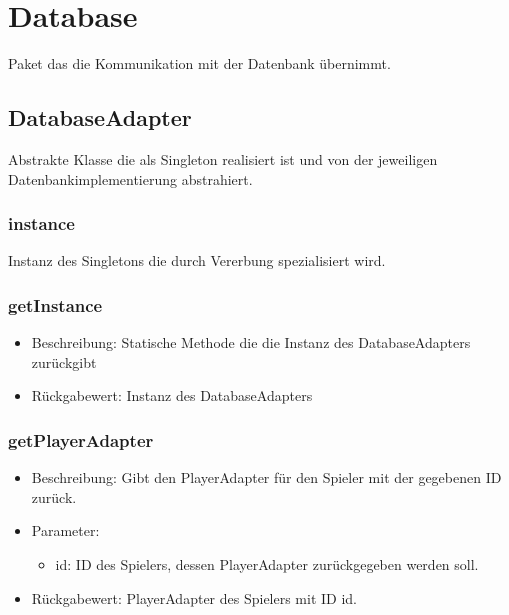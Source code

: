 \documentclass[a4paper]{scrreprt}
\begin{document}

    \section{Database}
    Paket das die Kommunikation mit der Datenbank übernimmt.

    \subsection{DatabaseAdapter}
    Abstrakte Klasse die als Singleton realisiert ist und von der jeweiligen Datenbankimplementierung abstrahiert.

    \subsubsection{instance}
    Instanz des Singletons die durch Vererbung spezialisiert wird.

    \subsubsection{getInstance}
    \begin{itemize}
        \item Beschreibung: Statische Methode die die Instanz des DatabaseAdapters zurückgibt
        \item Rückgabewert: Instanz des DatabaseAdapters
    \end{itemize}

    \subsubsection{getPlayerAdapter}
    \begin{itemize}
        \item Beschreibung: Gibt den PlayerAdapter für den Spieler mit der gegebenen ID zurück.
        \item Parameter:
        \begin{itemize}
            \item id: ID des Spielers, dessen PlayerAdapter zurückgegeben werden soll.
        \end{itemize}
        \item Rückgabewert: PlayerAdapter des Spielers mit ID id.
    \end{itemize}
\end{document}

